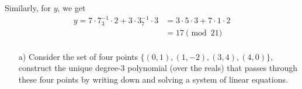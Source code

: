 \documentclass[]{article}
\begin{document}
\begin{qunlist}
{{\begin{enumerate}
Similarly, for $y$, we get
\begin{align*}
y = 7 \cdot 7^{-1}_3 \cdot 2 + 3 \cdot 3^{-1}_7 \cdot 3 &= 3 \cdot 5 \cdot 3 + 7 \cdot 1 \cdot 2 \\
&= 17 \pmod{21} \\
\end{align*}

  \end{enumerate}
}}\fi




\begin{itemize}
\qpart
\item[a)] Consider the set of four points $\{(0,1), (1,-2), (3,4), (4,0)\}$, construct the unique degree-$3$ polynomial (over the reals) that passes through these four points by writing down and solving a system of linear equations.



\end{itemize}
\end{qunlist}
\end{document}
